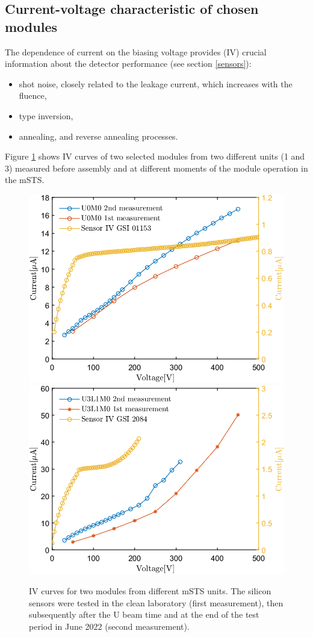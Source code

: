 \subsection{Current-voltage characteristic of chosen modules}
The dependence of current on the biasing voltage provides (IV) crucial information about the detector performance (see section \ref{sensors}):
\begin{itemize}
    \item shot noise, closely related to the leakage current, which increases with the fluence,
    \item type inversion,
    \item annealing, and reverse annealing processes.
\end{itemize}
Figure \ref{fig_IV} shows IV curves of two selected modules from two different units (1 and 3) measured before assembly and at different moments of the module operation in the \gls{mSTS}.
\begin{figure}[!h]
\centering
\includegraphics[width=0.48\columnwidth]{Chapter6/DCS/images/IV/U0FEB1.png}
\includegraphics[width=0.48\columnwidth]{Chapter6/DCS/images/IV/U3L1FEB1.png}
\caption{IV curves for two modules from different \gls{mSTS} units. The silicon sensors were tested in the clean laboratory (first measurement), then subsequently after the U beam time and at the end of the test period in June 2022 (second measurement).}
\label{fig_IV}
\end{figure}

